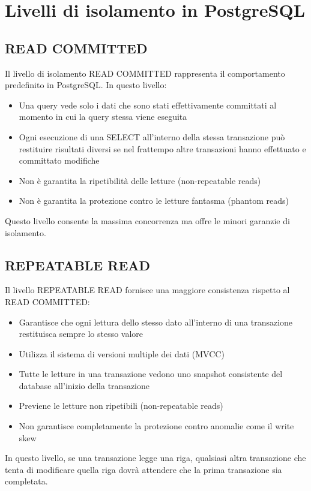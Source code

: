\documentclass[a4paper,12pt]{report}
\begin{document}
\chapter{Livelli di isolamento in PostgreSQL}
\section{READ COMMITTED}
Il livello di isolamento READ COMMITTED rappresenta il comportamento predefinito in PostgreSQL. In questo livello:

\begin{itemize}
    \item Una query vede solo i dati che sono stati effettivamente committati al momento in cui la query stessa viene eseguita
    \item Ogni esecuzione di una SELECT all'interno della stessa transazione può restituire risultati diversi se nel frattempo altre transazioni hanno effettuato e committato modifiche
    \item Non è garantita la ripetibilità delle letture (non-repeatable reads)
    \item Non è garantita la protezione contro le letture fantasma (phantom reads)
\end{itemize}

Questo livello consente la massima concorrenza ma offre le minori garanzie di isolamento.

\section{REPEATABLE READ}
Il livello REPEATABLE READ fornisce una maggiore consistenza rispetto al READ COMMITTED:

\begin{itemize}
    \item Garantisce che ogni lettura dello stesso dato all'interno di una transazione restituisca sempre lo stesso valore
    \item Utilizza il sistema di versioni multiple dei dati (MVCC)
    \item Tutte le letture in una transazione vedono uno snapshot consistente del database all'inizio della transazione
    \item Previene le letture non ripetibili (non-repeatable reads)
    \item Non garantisce completamente la protezione contro anomalie come il write skew
\end{itemize}

In questo livello, se una transazione legge una riga, qualsiasi altra transazione che tenta di modificare quella riga dovrà attendere che la prima transazione sia completata.
\end{document}

